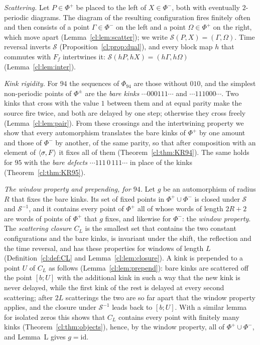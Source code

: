 \emph{Scattering.} Let $P\in\Phi^+$ be placed to the left of $X\in\Phi^-$, both with eventually $2$-periodic diagrams. The diagram of the resulting configuration fires finitely often and then consists of a point $\Gamma\in\Phi^-$ on the left and a point $\Omega\in\Phi^+$ on the right, which move apart (Lemma~\ref{cl:lem:scatter}); we write $\mathcal S(P,X)=(\Gamma,\Omega)$. Time reversal inverts $\mathcal S$ (Proposition~\ref{cl:prop:dual}), and every block map $h$ that commutes with $F_f$ intertwines it: $\mathcal S(hP,hX)=(h\Gamma,h\Omega)$ (Lemma~\ref{cl:lem:inter}).

\emph{Kink rigidity.} For $94$ the sequences of $\Phi_{94}$ are those without $010$, and the simplest non-periodic points of $\Phi^\pm$ are the \emph{bare kinks} $\cdots000111\cdots$ and $\cdots111000\cdots$. Two kinks that cross with the value $1$ between them and at equal parity make the source fire twice, and both are delayed by one step; otherwise they cross freely (Lemma~\ref{cl:lem:pair}). From these crossings and the intertwining property we show that every automorphism translates the bare kinks of $\Phi^+$ by one amount and those of $\Phi^-$ by another, of the same parity, so that after composition with an element of $\langle\sigma,F\rangle$ it fixes all of them (Theorem~\ref{cl:thm:KR94}). The same holds for $95$ with the \emph{bare defects} $\cdots111\,0\,111\cdots$ in place of the kinks (Theorem~\ref{cl:thm:KR95}).

\emph{The window property and prepending, for $94$.} Let $g$ be an automorphism of radius $R$ that fixes the bare kinks. Its set of fixed points in $\Phi^+\cup\Phi^-$ is closed under $\mathcal S$ and $\mathcal S^{-1}$, and it contains every point of $\Phi^+$ all of whose words of length $2R+2$ are words of points of $\Phi^+$ that $g$ fixes, and likewise for $\Phi^-$: the \emph{window property}. The \emph{scattering closure} $C_L$ is the smallest set that contains the two constant configurations and the bare kinks, is invariant under the shift, the reflection and the time reversal, and has these properties for windows of length $L$ (Definition~\ref{cl:def:CL} and Lemma~\ref{cl:lem:closure}). A kink is prepended to a point $U$ of $C_L$ as follows (Lemma~\ref{cl:lem:prepend}): bare kinks are scattered off the point $[b;U]$ with the additional kink in such a way that the new kink is never delayed, while the first kink of the rest is delayed at every second scattering; after $2L$ scatterings the two are so far apart that the window property applies, and the closure under $\mathcal S^{-1}$ leads back to $[b;U]$. With a similar lemma for isolated zeros this shows that $C_L$ contains every point with finitely many kinks (Theorem~\ref{cl:thm:objects}), hence, by the window property, all of $\Phi^+\cup\Phi^-$, and Lemma~L gives $g=\mathrm{id}$.

